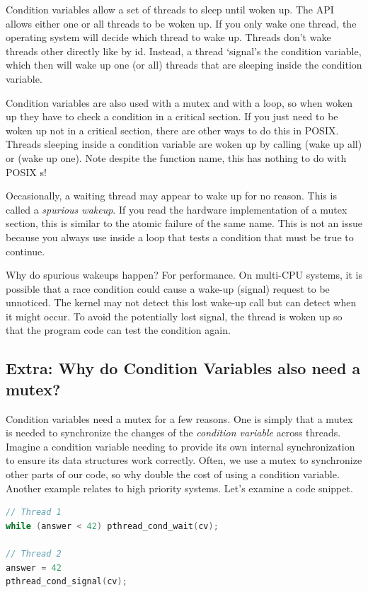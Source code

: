 Condition variables allow a set of threads to sleep until woken up.
The API allows either one or all threads to be woken up.
If you only wake one thread, the operating system will decide which thread to wake up.
Threads don't wake threads other directly like by id.
Instead, a thread `signal's the condition variable, which then will wake up one (or all) threads that are sleeping inside the condition variable.

Condition variables are also used with a mutex and with a loop, so when woken up they have to check a condition in a critical section.
If you just need to be woken up not in a critical section, there are other ways to do this in POSIX.
Threads sleeping inside a condition variable are woken up by calling  (wake up all) or  (wake up one).
Note despite the function name, this has nothing to do with POSIX s!

Occasionally, a waiting thread may appear to wake up for no reason. This is called a \emph{spurious wakeup}.
If you read the hardware implementation of a mutex section, this is similar to the atomic failure of the same name.
This is not an issue because you always use  inside a loop that tests a condition that must be true to continue.

Why do spurious wakeups happen?
For performance.
On multi-CPU systems, it is possible that a race condition could cause a wake-up (signal) request to be unnoticed.
The kernel may not detect this lost wake-up call but can detect when it might occur.
To avoid the potentially lost signal, the thread is woken up so that the program code can test the condition again.

\subsection{Extra: Why do Condition Variables also need a mutex?}

Condition variables need a mutex for a few reasons.
One is simply that a mutex is needed to synchronize the changes of the \textit{condition variable} across threads.
Imagine a condition variable needing to provide its own internal synchronization to ensure its data structures work correctly.
Often, we use a mutex to synchronize other parts of our code, so why double the cost of using a condition variable.
Another example relates to high priority systems.
Let's examine a code snippet.

\begin{lstlisting}[language=C]
// Thread 1
while (answer < 42) pthread_cond_wait(cv);

// Thread 2
answer = 42
pthread_cond_signal(cv);
\end{lstlisting}

